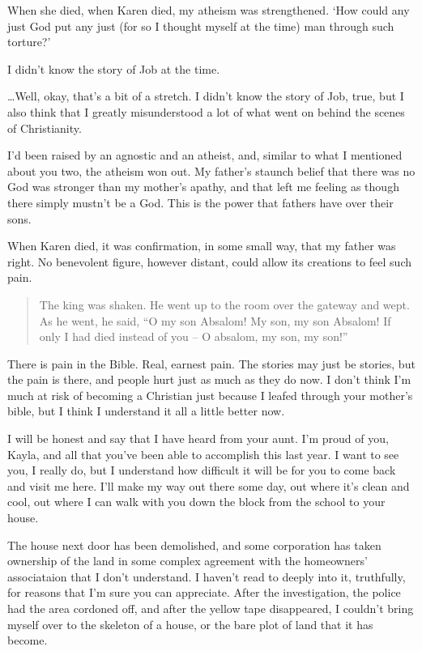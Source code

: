 \begin{itshape}
When she died, when Karen died, my atheism was strengthened.  `How could any just God put any just (for so I thought myself at the time) man through such torture?'

I didn't know the story of Job at the time.

\ldots{}Well, okay, that's a bit of a stretch.  I didn't know the story of Job, true, but I also think that I greatly misunderstood a lot of what went on behind the scenes of Christianity.

I'd been raised by an agnostic and an atheist, and, similar to what I mentioned about you two, the atheism won out.  My father's staunch belief that there was no God was stronger than my mother's apathy, and that left me feeling as though there simply mustn't be a God.  This is the power that fathers have over their sons.

When Karen died, it was confirmation, in some small way, that my father was right.  No benevolent figure, however distant, could allow its creations to feel such pain.


\begin{quote}
  The king was shaken.  He went up to the room over the gateway and wept.  As he went, he said, ``O my son Absalom! My son, my son Absalom! If only I had died instead of you -- O absalom, my son, my son!''
\end{quote}

There is pain in the Bible.  Real, earnest pain.  The stories may just be stories, but the pain is there, and people hurt just as much as they do now.  I don't think I'm much at risk of becoming a Christian just because I leafed through your mother's bible, but I think I understand it all a little better now.


I will be honest and say that I have heard from your aunt.  I'm proud of you, Kayla, and all that you've been able to accomplish this last year.  I want to see you, I really do, but I understand how difficult it will be for you to come back and visit me here.  I'll make my way out there some day, out where it's clean and cool, out where I can walk with you down the block from the school to your house.

The house next door has been demolished, and some corporation has taken ownership of the land in some complex agreement with the homeowners' associataion that I don't understand.  I haven't read to deeply into it, truthfully, for reasons that I'm sure you can appreciate.  After the investigation, the police had the area cordoned off, and after the yellow tape disappeared, I couldn't bring myself over to the skeleton of a house, or the bare plot of land that it has become.


\end{itshape}
